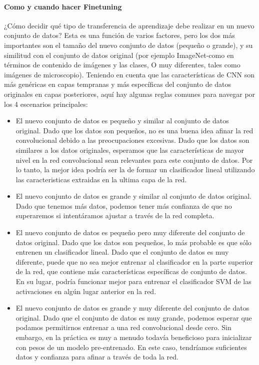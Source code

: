 \documentclass[a4paper,12pt,spanish]{book}
\begin{document}
      \paragraph{Como y cuando hacer Finetuning}
	¿Cómo decidir qué tipo de transferencia de aprendizaje debe realizar en un nuevo conjunto de datos? Esta es una función de varios factores, pero los dos más importantes son el 
	tamaño del nuevo conjunto de datos (pequeño o grande), y su similitud con el conjunto de datos original (por ejemplo ImageNet-como en términos de contenido de imágenes y las clases,
	O muy diferentes, tales como imágenes de microscopio). Teniendo en cuenta que las características de CNN son más genéricas en capas tempranas y más específicas del conjunto de datos
	originales en capas posteriores, aquí hay algunas reglas comunes para navegar por los 4 escenarios principales:
	\begin{itemize}
	  \item El nuevo conjunto de datos es pequeño y similar al conjunto de datos original. Dado que los datos son pequeños, no es una buena idea afinar la red convolucional debido a las 
	  preocupaciones excesivas. Dado que los datos son similares a los datos originales, esperamos que las características de mayor nivel en la red convolucional sean relevantes para este
	  conjunto de datos. Por lo tanto, la mejor idea podría ser la de formar un clasificador lineal utilizando las caracteristicas extraidas en la ultima capa de la red.
	  \item El nuevo conjunto de datos es grande y similar al conjunto de datos original. Dado que tenemos más datos, podemos tener más confianza de que no superaremos si intentáramos 
	  ajustar a través de la red completa.
	  \item El nuevo conjunto de datos es pequeño pero muy diferente del conjunto de datos original. Dado que los datos son pequeños, lo más probable es que sólo entrenen un clasificador 
	  lineal. Dado que el conjunto de datos es muy diferente, puede que no sea mejor entrenar al clasificador en la parte superior de la red, que contiene más características específicas
	  de conjunto de datos. En su lugar, podría funcionar mejor para entrenar el clasificador SVM de las activaciones en algún lugar anterior en la red.
	  \item El nuevo conjunto de datos es grande y muy diferente del conjunto de datos original. Dado que el conjunto de datos es muy grande, podemos esperar que podamos permitirnos 
	  entrenar a una red convolucional desde cero. Sin embargo, en la práctica es muy a menudo todavía beneficioso para inicializar con pesos de un modelo pre-entrenado. 
	  En este caso, tendríamos suficientes datos y confianza para afinar a través de toda la red.
	\end{itemize}
\end{document}
